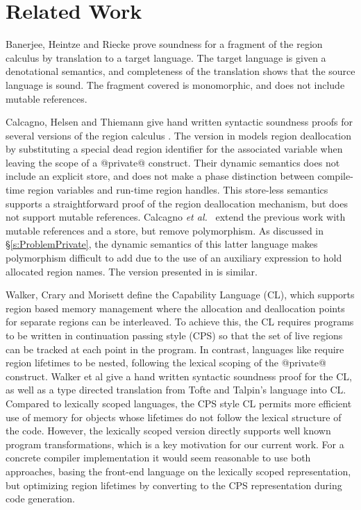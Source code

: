 \section{Related Work}

Banerjee, Heintze and Riecke  prove soundness for a fragment of the region calculus \cite{Tofte:theory} by translation to a target language. The target language is given a denotational semantics, and completeness of the translation shows that the source language is sound. The fragment covered is monomorphic, and does not include mutable references.


Calcagno, Helsen and Thiemann  give hand written syntactic soundness proofs for several versions of the region calculus \cite{Tofte:theory}. The version in \cite{Helsen:soundness-region-calclus} models region deallocation by substituting a special dead region identifier for the associated variable when leaving the scope of a @private@ construct. Their dynamic semantics does not include an explicit store, and does not make a phase distinction between compile-time region variables and run-time region handles. This store-less semantics supports a straightforward proof of the region deallocation mechanism, but does not support mutable references. Calcagno \emph{et al.}~ extend the previous work with mutable references and a store, but remove polymorphism. As discussed in \S\ref{s:ProblemPrivate}, the dynamic semantics of this latter language makes polymorphism difficult to add due to the use of an auxiliary expression to hold allocated region names. The version presented in \cite{Calcagno:stratified} is similar.


Walker, Crary and Morisett  define the Capability Language (CL), which supports region based memory management where the allocation and deallocation points for separate regions can be interleaved. To achieve this, the CL requires programs to be written in continuation passing style (CPS) so that the set of live regions can be tracked at each point in the program. In contrast, languages like \SystemFre require region lifetimes to be nested, following the lexical scoping of the @private@ construct. Walker et al give a hand written syntactic soundness proof for the CL, as well as a type directed translation from Tofte and Talpin's language into CL. Compared to lexically scoped languages, the CPS style CL permits more efficient use of memory for objects whose lifetimes do not follow the lexical structure of the code. However, the lexically scoped version directly supports well known program transformations, which is a key motivation for our current work. For a concrete compiler implementation it would seem reasonable to use both approaches, basing the front-end language on the lexically scoped representation, but optimizing region lifetimes by converting to the CPS representation during code generation.


